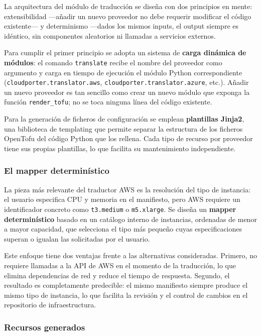La arquitectura del módulo de traducción se diseña con dos principios en mente: extensibilidad
—añadir un nuevo proveedor no debe requerir modificar el código existente— y determinismo
—dados los mismos inputs, el output siempre es idéntico, sin componentes aleatorios ni
llamadas a servicios externos.

Para cumplir el primer principio se adopta un sistema de \textbf{carga dinámica de módulos}:
el comando \texttt{translate} recibe el nombre del proveedor como argumento y carga en tiempo
de ejecución el módulo Python correspondiente (\texttt{cloudporter.translator.aws},
\texttt{cloudporter.translator.azure}, etc.). Añadir un nuevo proveedor es tan sencillo como
crear un nuevo módulo que exponga la función \texttt{render\_tofu}; no se toca ninguna línea
del código existente.

Para la generación de ficheros de configuración se emplean \textbf{plantillas Jinja2}, una
biblioteca de templating que permite separar la estructura de los ficheros OpenTofu
del código Python que los rellena. Cada tipo de recurso por proveedor tiene sus propias
plantillas, lo que facilita su mantenimiento independiente.

\subsubsection{El mapper determinístico}

La pieza más relevante del traductor AWS es la resolución del tipo de instancia: el usuario
especifica CPU y memoria en el manifiesto, pero AWS requiere un identificador concreto como
\texttt{t3.medium} o \texttt{m5.xlarge}. Se diseña un \textbf{mapper determinístico} basado
en un catálogo interno de instancias, ordenadas de menor a mayor capacidad, que selecciona
el tipo más pequeño cuyas especificaciones superan o igualan las solicitadas por el usuario.

Este enfoque tiene dos ventajas frente a las alternativas consideradas. Primero, no requiere
llamadas a la API de AWS en el momento de la traducción, lo que elimina dependencias de red
y reduce el tiempo de respuesta. Segundo, el resultado es completamente predecible: el mismo
manifiesto siempre produce el mismo tipo de instancia, lo que facilita la revisión y el
control de cambios en el repositorio de infraestructura.

\subsubsection{Recursos generados}

